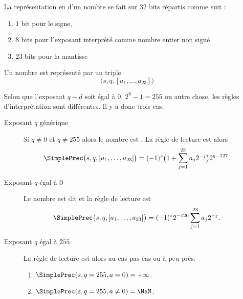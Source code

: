 \begin{definition}        \label{DEFooEIOZooYLDVjs}
    La représentation en  d'un nombre se fait sur \( 32\) bits répartis comme suit :
    \begin{enumerate}
        \item
            \( 1\) bit pour le signe,
        \item
            \( 8\) bits pour l'exposant interprété comme nombre entier non signé
        \item
            \( 23\) bits pour la mantisse
    \end{enumerate}

    Un nombre est représenté par un triple
    \begin{equation}
        \big( s,q,[a_1,\ldots, a_{23}] \big)
    \end{equation}

    Selon que l'exposant \( q-d\) soit égal à \( 0\), \( 2^8-1=255\) ou autre chose, les règles d'interprétation sont différentes. Il y a donc trois cas.
    \begin{description}
        \item[Exposant \( q\) générique\cite{ooMPTNooYbSwJS}]
           Si \( q\neq 0\) et \( q\neq 255\) alors le nombre est . La règle de lecture est alors
           \begin{equation}        \label{EQooEFEKooIrUaKj}
                \SimplePrec\big( s,q,[a_1,\ldots, a_{23}] \big)=(-1)^s\big( 1+\sum_{j=1}^{23}a_j2^{-j} \big)2^{q-127}.
            \end{equation}
        \item[Exposant \( q\) égal à \( 0\)] Le nombre est dit  et la règle de lecture est
            \begin{equation}        \label{EQooRTBFooIplydi}
                \SimplePrec\big( s,q,[a_1,\ldots, a_{23}] \big)=(-1)^s2^{-126}\sum_{j=1}^{23}a_j2^{-j}.
            \end{equation}
        \item[Exposant \( q\) égal à \( 255\)]
            La règle de lecture est alors au cas pas cas ou à peu près.
            \begin{enumerate}
                \item
                    \( \SimplePrec(s,q=255,a=0)=+\infty\).
                \item
                    \( \SimplePrec(s,q=255,a\neq 0)=\NaN\).
            \end{enumerate}
    \end{description}
\end{definition}

